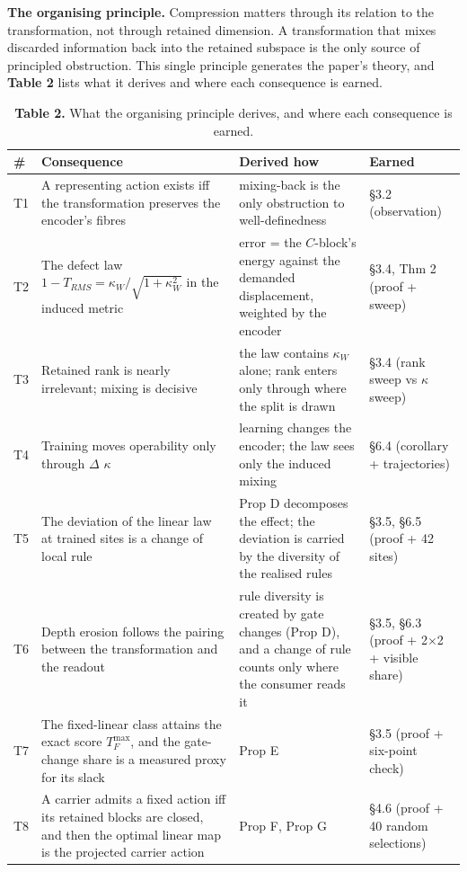 \textbf{The organising principle.} Compression matters through its relation to the transformation, not through retained dimension. A transformation that mixes discarded information back into the retained subspace is the only source of principled obstruction. This single principle generates the paper's theory, and \textbf{Table 2} lists what it derives and where each consequence is earned.


\begin{table}[t]
\centering
\small
\caption*{\textbf{Table 2.} What the organising principle derives, and where each consequence is earned.}
\begin{tabularx}{\textwidth}{@{}>{\raggedright\arraybackslash}X >{\raggedright\arraybackslash}X >{\raggedright\arraybackslash}X >{\raggedright\arraybackslash}X@{}}
\toprule
\textbf{\#} & \textbf{Consequence} & \textbf{Derived how} & \textbf{Earned} \\
\midrule
T1 & A representing action exists iff the transformation preserves the encoder's fibres & mixing-back is the only obstruction to well-definedness & \S{}3.2 (observation) \\
T2 & The defect law $1-T_{RMS}=\kappa_W/\sqrt{1+\kappa_W^2}$ in the induced metric & error = the $C$-block's energy against the demanded displacement, weighted by the encoder & \S{}3.4, Thm 2 (proof + sweep) \\
T3 & Retained rank is nearly irrelevant; mixing is decisive & the law contains $\kappa_W$ alone; rank enters only through where the split is drawn & \S{}3.4 (rank sweep vs $\kappa$ sweep) \\
T4 & Training moves operability only through $\Delta$ $\kappa$ & learning changes the encoder; the law sees only the induced mixing & \S{}6.4 (corollary + trajectories) \\
T5 & The deviation of the linear law at trained sites is a change of local rule & Prop D decomposes the effect; the deviation is carried by the diversity of the realised rules & \S{}3.5, \S{}6.5 (proof + 42 sites) \\
T6 & Depth erosion follows the pairing between the transformation and the readout & rule diversity is created by gate changes (Prop D), and a change of rule counts only where the consumer reads it & \S{}3.5, \S{}6.3 (proof + 2$\times$2 + visible share) \\
T7 & The fixed-linear class attains the exact score $T_F^{\max}$, and the gate-change share is a measured proxy for its slack & Prop E & \S{}3.5 (proof + six-point check) \\
T8 & A carrier admits a fixed action iff its retained blocks are closed, and then the optimal linear map is the projected carrier action & Prop F, Prop G & \S{}4.6 (proof + 40 random selections) \\
\bottomrule
\end{tabularx}
\end{table}

